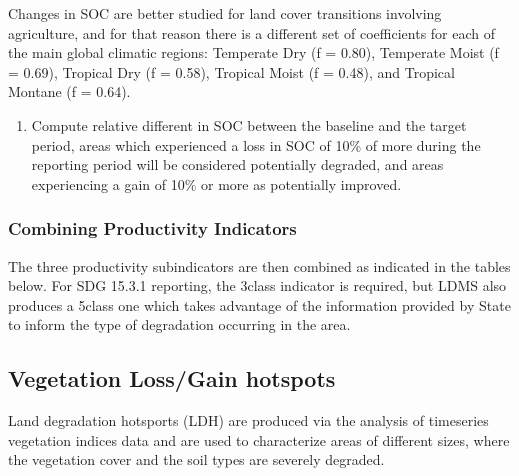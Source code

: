 \documentclass[letterpaper,10pt,english]{sphinxmanual}
\begin{document}

\sphinxAtStartPar
Changes in SOC are better studied for land cover transitions involving
agriculture, and for that reason there is a different set of coefficients for
each of the main global climatic regions: Temperate Dry (f = 0.80), Temperate
Moist (f = 0.69), Tropical Dry (f = 0.58), Tropical Moist (f = 0.48), and
Tropical Montane (f = 0.64).
\begin{enumerate}
%
\setcounter{enumi}{3}
\item {} 
\sphinxAtStartPar
Compute relative different in SOC between the baseline and the target
period, areas which experienced a loss in SOC of 10\% of more during the
reporting period will be considered potentially degraded, and areas
experiencing a gain of 10\% or more as potentially improved.

\end{enumerate}



\subsubsection{Combining Productivity Indicators}
\label{\detokenize{Background/LD_indicators:combining-productivity-indicators}}
\sphinxAtStartPar
The three productivity sub\sphinxhyphen{}indicators are then combined as indicated in the
tables below. For SDG 15.3.1 reporting, the 3\sphinxhyphen{}class indicator is required, but
LDMS also produces a 5\sphinxhyphen{}class one which takes advantage of the
information provided by State to inform the type of degradation occurring in
the area.



\subsection{Vegetation Loss/Gain hotspots}
\label{\detokenize{Background/LD_indicators:vegetation-loss-gain-hotspots}}
\sphinxAtStartPar
Land degradation hotsports (LDH) are produced via the analysis of time\sphinxhyphen{}series vegetation indices data and are used to characterize areas of different sizes, where the vegetation cover and the soil types are severely degraded.
\end{document}
